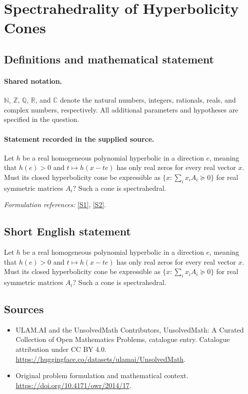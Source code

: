 \documentclass[11pt]{article}
\newcommand{\sref}[2]{\hyperlink{source:#1:#2}{[S#2]}}
\begin{document}
\section{Spectrahedrality of Hyperbolicity Cones}\label{statement}

\subsection{Definitions and mathematical statement}

\paragraph{Shared notation.}$\mathbb N$, $\mathbb Z$, $\mathbb Q$, $\mathbb R$, and $\mathbb C$ denote the natural numbers, integers, rationals, reals, and complex numbers, respectively. All additional parameters and hypotheses are specified in the question.


\paragraph{Statement recorded in the supplied source.}
Let $h$ be a real homogeneous polynomial hyperbolic in a direction $e$, meaning that $h(e)>0$ and $t\mapsto h(x-te)$ has only real zeros for every real vector $x$. Must its closed hyperbolicity cone be expressible as $\{x:\sum_i x_iA_i\succeq0\}$ for real symmetric matrices $A_i$? Such a cone is spectrahedral.
\par\smallskip\textit{Formulation references:} \sref{statement}{1}, \sref{statement}{2}.
\subsection{Short English statement}
Let $h$ be a real homogeneous polynomial hyperbolic in a direction $e$, meaning that $h(e)>0$ and $t\mapsto h(x-te)$ has only real zeros for every real vector $x$. Must its closed hyperbolicity cone be expressible as $\{x:\sum_i x_iA_i\succeq0\}$ for real symmetric matrices $A_i$? Such a cone is spectrahedral.
\subsection{Sources}
\begin{itemize}
\item[\hypertarget{source:statement:1}{S1}] ULAM.AI and the UnsolvedMath Contributors, UnsolvedMath: A Curated Collection of Open Mathematics Problems, catalogue entry. Catalogue attribution under CC BY 4.0.
\url{https://huggingface.co/datasets/ulamai/UnsolvedMath}.
\item[\hypertarget{source:statement:2}{S2}] Original problem formulation and mathematical context.
\url{https://doi.org/10.4171/owr/2014/17}.
\end{itemize}
\label{end:statement}
\end{document}
